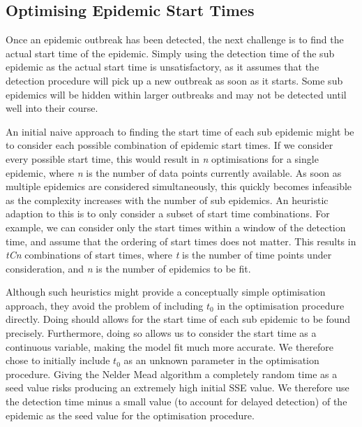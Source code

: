 \subsection{Optimising Epidemic Start Times}
Once an epidemic outbreak has been detected, the next challenge is to
find the actual start time of the epidemic. Simply using the detection
time of the sub epidemic as the actual start time is unsatisfactory,
as it assumes that the detection procedure will pick up a new outbreak
as soon as it starts. Some sub epidemics will be hidden within larger
outbreaks and may not be detected until well into their course. 

An initial naive approach to finding the start time of each sub
epidemic might be to consider each possible combination of epidemic
start times. If we consider every possible start time, this would
result in \emph{n}
optimisations for a single epidemic, where \emph{n} is the number of
data points currently available. As soon as multiple epidemics are
considered simultaneously, this quickly becomes infeasible as the
complexity increases with the number of sub epidemics. An heuristic adaption to this is to only consider a subset of start
time combinations. For example, we can consider only the start times
within a window of the detection time, and assume that the ordering of
start times does not matter. This results in \emph{tCn} combinations
of start times, where \emph{t} is the number of time points under
consideration, and \emph{n} is the number of epidemics to be
fit. 

Although such heuristics  might provide a
conceptually simple optimisation approach, they avoid the problem of
including $t_0$ in the optimisation procedure directly. Doing should
allows for the start time of each sub epidemic to be found
precisely. Furthermore, doing so allows us to consider the start time
as a continuous variable, making the model fit much more accurate. We
therefore chose to initially include $t_0$ as an unknown parameter in
the optimisation procedure. Giving the Nelder Mead algorithm a
completely random time as a seed value risks producing an extremely
high initial SSE value. We therefore use the detection time minus a
small value (to account for delayed detection) of the epidemic
as the seed value for the optimisation procedure. 

